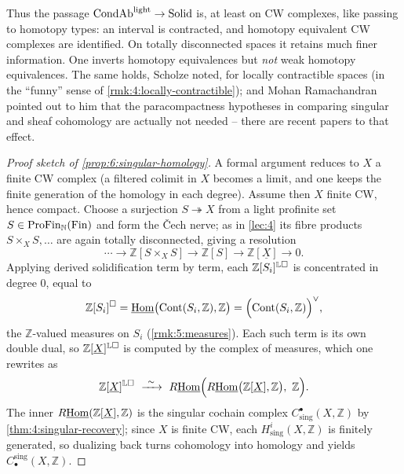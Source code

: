 \begin{remark}
\label{rmk:6:homotopy-types}
Thus the passage $\mathrm{CondAb}^{\mathrm{light}}\to\mathrm{Solid}$ is, at least on CW complexes, like passing
to homotopy types: an interval is contracted, and homotopy equivalent CW
complexes are identified. On totally disconnected spaces it retains much finer
information. One inverts homotopy equivalences but \emph{not} weak homotopy
equivalences. The same holds, Scholze noted, for locally contractible spaces (in
the ``funny'' sense of \cref{rmk:4:locally-contractible}); and Mohan Ramachandran
pointed out to him that the paracompactness hypotheses in comparing singular and
sheaf cohomology are actually not needed -- there are recent papers to that
effect.
\end{remark}

\begin{proof}[Proof sketch of \cref{prop:6:singular-homology}]
A formal argument reduces to $X$ a finite CW complex (a filtered colimit in $X$
becomes a limit, and one keeps the finite generation of the homology in each
degree). Assume then $X$ finite CW, hence compact. Choose a surjection
$S\twoheadrightarrow X$ from a light profinite set $S\in\mathrm{ProFin}_{\mathbb{N}}(\mathrm{Fin})$
and form the \v{C}ech nerve; as in \cref{lec:4} its fibre products $S\times_X S,\dots$
are again totally disconnected, giving a resolution
\begin{equation*}
\cdots\to\mathbb{Z}[S\times_{X}S]\to\mathbb{Z}[S]\to\mathbb{Z}[\underline{X}]\to0.
\end{equation*}
Applying derived solidification term by term, each $\mathbb{Z}[S_i]^{\mathbb{L}\square}$
is concentrated in degree $0$, equal to
\begin{equation*}
\mathbb{Z}[S_i]^{\square}=\underline{\operatorname{Hom}}\bigl(\operatorname{Cont}(S_i,\mathbb{Z}),\mathbb{Z}\bigr)
=\Bigl(\operatorname{Cont}(S_i,\mathbb{Z})\Bigr)^{\vee},
\end{equation*}
the $\mathbb{Z}$-valued measures on $S_i$ (\cref{rmk:5:measures}). Each such term
is its own double dual, so $\mathbb{Z}[\underline{X}]^{\mathbb{L}\square}$ is
computed by the complex of measures, which one rewrites as
\begin{equation*}
\mathbb{Z}[\underline{X}]^{\mathbb{L}\solid}\ \xrightarrow{\ \sim\ }\
R\iHom\Bigl(R\iHom\bigl(\mathbb{Z}[\underline{X}],\mathbb{Z}\bigr),\ \mathbb{Z}\Bigr).
\end{equation*}
The inner $R\underline{\operatorname{Hom}}(\mathbb{Z}[\underline{X}],\mathbb{Z})$ is the singular cochain
complex $C^{\bullet}_{\mathrm{sing}}(X,\mathbb{Z})$ by
\cref{thm:4:singular-recovery}; since $X$ is finite CW, each
$H^{i}_{\mathrm{sing}}(X,\mathbb{Z})$ is finitely generated, so dualizing back
turns cohomology into homology and yields
$C^{\mathrm{sing}}_{\bullet}(X,\mathbb{Z})$.
\end{proof}

